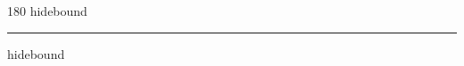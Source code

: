 
\begin{frame}
\begin{center}
\begin{turn}{180}
{\fontsize{2.5cm}{1em}\selectfont hidebound}
\end{turn}
\vspace{1em}\par  
\hrule
\vspace{1em}\par  
{\fontsize{2.5cm}{1em}\selectfont hidebound}
\end{center}
\end{frame}
